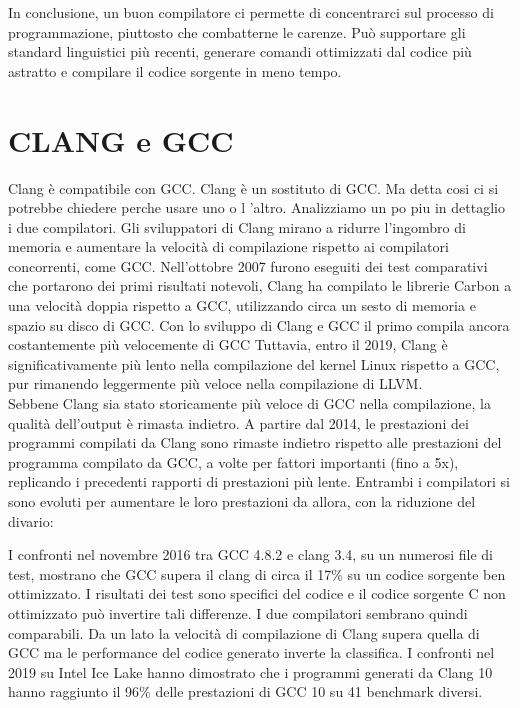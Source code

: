 \documentclass[12pt,a4paper]{report}
\begin{document}
In conclusione, un buon compilatore ci permette di concentrarci sul processo di programmazione, piuttosto che combatterne le carenze. Può supportare gli standard linguistici più recenti, generare comandi ottimizzati dal codice più astratto e compilare il codice sorgente in meno tempo.



\section{CLANG e GCC}
Clang è compatibile con GCC. Clang è un sostituto di GCC. Ma detta cosi ci si potrebbe chiedere perche usare uno o l 'altro. Analizziamo un po piu in dettaglio i due compilatori.
Gli sviluppatori di Clang mirano a ridurre l'ingombro di memoria e aumentare la velocità di compilazione rispetto ai compilatori concorrenti, come GCC. Nell'ottobre 2007 furono eseguiti dei test comparativi che portarono dei primi risultati notevoli, Clang ha compilato le librerie Carbon a una velocità doppia rispetto a GCC, utilizzando circa un sesto di memoria e spazio su disco di GCC. Con lo sviluppo di Clang e GCC il primo compila ancora costantemente più velocemente di GCC Tuttavia, entro il 2019, Clang è significativamente più lento nella compilazione del kernel Linux rispetto a GCC, pur rimanendo leggermente più veloce nella compilazione di LLVM.\\
Sebbene Clang sia stato storicamente più veloce di GCC nella compilazione, la qualità dell'output è rimasta indietro. A partire dal 2014, le prestazioni dei programmi compilati da Clang sono rimaste indietro rispetto alle prestazioni del programma compilato da GCC, a volte per fattori importanti (fino a 5x), replicando i precedenti rapporti di prestazioni più lente. Entrambi i compilatori si sono evoluti per aumentare le loro prestazioni da allora, con la riduzione del divario:

I confronti nel novembre 2016 tra GCC 4.8.2 e clang 3.4, su un numerosi file di test, mostrano che GCC supera il clang di circa il 17\% su un codice sorgente ben ottimizzato. I risultati dei test sono specifici del codice e il codice sorgente C non ottimizzato può invertire tali differenze. I due compilatori sembrano quindi  comparabili. Da un lato la velocità di compilazione di Clang supera quella di GCC ma le performance del codice generato inverte la classifica.
I confronti nel 2019 su Intel Ice Lake hanno dimostrato che i programmi generati da Clang 10 hanno raggiunto il 96\% delle prestazioni di GCC 10 su 41 benchmark diversi.
\cite{GCCvsCLANG}
\end{document}
